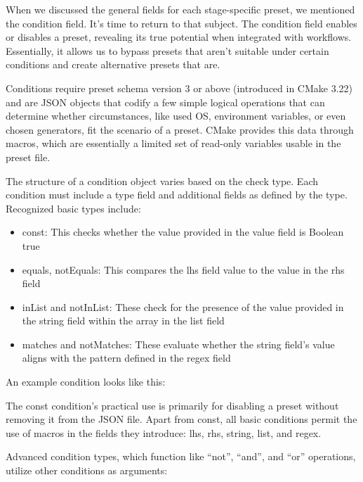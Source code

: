 When we discussed the general fields for each stage-specific preset, we mentioned the condition field. It’s time to return to that subject. The condition field enables or disables a preset, revealing its true potential when integrated with workflows. Essentially, it allows us to bypass presets that aren’t suitable under certain conditions and create alternative presets that are.

Conditions require preset schema version 3 or above (introduced in CMake 3.22) and are JSON objects that codify a few simple logical operations that can determine whether circumstances, like used OS, environment variables, or even chosen generators, fit the scenario of a preset. CMake provides this data through macros, which are essentially a limited set of read-only variables usable in the preset file.

The structure of a condition object varies based on the check type. Each condition must include a type field and additional fields as defined by the type. Recognized basic types include:

\begin{itemize}
\item
const: This checks whether the value provided in the value field is Boolean true

\item
equals, notEquals: This compares the lhs field value to the value in the rhs field

\item
inList and notInList: These check for the presence of the value provided in the string field within the array in the list field

\item
matches and notMatches: These evaluate whether the string field’s value aligns with the pattern defined in the regex field
\end{itemize}

An example condition looks like this:


The const condition’s practical use is primarily for disabling a preset without removing it from the JSON file. Apart from const, all basic conditions permit the use of macros in the fields they introduce: lhs, rhs, string, list, and regex.

Advanced condition types, which function like “not”, “and”, and “or” operations, utilize other conditions as arguments:

